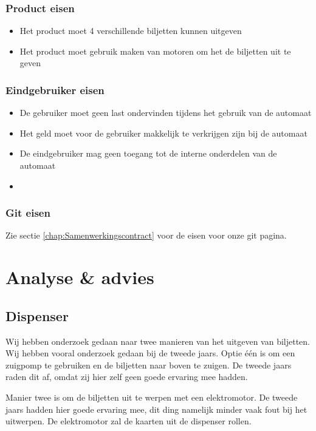 \documentclass{article}
\begin{document}
\subsubsection{Product eisen}
\begin{itemize}
	\item Het product moet 4 verschillende biljetten kunnen uitgeven
	\item Het product moet gebruik maken van motoren om het de biljetten uit te geven
\end{itemize}

\subsubsection{Eindgebruiker eisen}
\begin{itemize}
	\item De gebruiker moet geen last ondervinden tijdens het gebruik van de automaat
	\item Het geld moet voor de gebruiker makkelijk te verkrijgen zijn bij de automaat
	\item De eindgebruiker mag geen toegang tot de interne onderdelen van de automaat
	\item 
\end{itemize}
\subsubsection{Git eisen}

Zie sectie \ref{chap:Samenwerkingscontract} voor de eisen voor onze git pagina.



\section{Analyse \& advies}

\subsection{Dispenser}

Wij hebben onderzoek gedaan naar twee manieren van het uitgeven van biljetten.
Wij hebben vooral onderzoek gedaan bij de tweede jaars.
Optie \'e\'en is om een zuigpomp te gebruiken en de biljetten naar boven te zuigen.
De tweede jaars raden dit af, omdat zij hier zelf geen goede ervaring mee hadden.

Manier twee is om de biljetten uit te werpen met een elektromotor.
De tweede jaars hadden hier goede ervaring mee, dit ding namelijk minder vaak fout bij het uitwerpen.
De elektromotor zal de kaarten uit de dispenser rollen.
\end{document}
